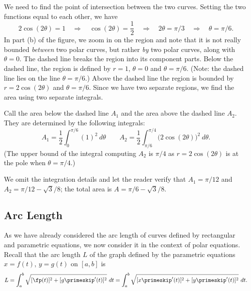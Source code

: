 {We need to find the point of intersection between the two curves. Setting the two functions equal to each other, we have
$$2\cos(2\theta) = 1 \quad \Rightarrow \quad \cos(2\theta) = \frac12 \quad \Rightarrow \quad 2\theta = \pi/3\quad \Rightarrow \quad \theta=\pi/6.$$
In part (b) of the figure, we zoom in on the region and note that it is not really bounded \textit{between} two polar curves, but rather \textit{by} two polar curves, along with $\theta=0$. The dashed line breaks the region into its component parts. Below the dashed line, the region is defined by $r=1$, $\theta=0$ and $\theta = \pi/6$. (Note: the dashed line lies on the line $\theta=\pi/6$.) Above the dashed line the region is bounded by $r=2\cos(2\theta)$ and $\theta =\pi/6$. Since we have two separate regions, we find the area using two separate integrals.

Call the area below the dashed line $A_1$ and the area above the dashed line $A_2$. They are determined by the following integrals:
$$A_1 = \frac12\int_0^{\pi/6} (1)^2\ d\theta\qquad  A_2 = \frac12\int_{\pi/6}^{\pi/4} \big(2\cos(2\theta)\big)^2\ d\theta.$$
(The upper bound of the integral computing $A_2$ is $\pi/4$ as $r=2\cos(2\theta)$ is at the pole when $\theta=\pi/4$.)

We omit the integration details and let the reader verify that $A_1 = \pi/12$ and $A_2 = \pi/12-\sqrt{3}/8$; the total area is $A = \pi/6-\sqrt{3}/8$.}

\subsection*{Arc Length}

As we have already considered the arc length of curves defined by rectangular and parametric equations, we now consider it in the context of polar equations. Recall that the arc length $L$ of the graph defined by the parametric equations $x=f(t)$, $y=g(t)$ on $[a,b]$ is
\begin{equation}L = \int_a^b \sqrt{[\fp(t)]^2 + [g\primeskip'(t)]^2}\ dt = \int_a^b \sqrt{[x\primeskip'(t)]^2+[y\primeskip'(t)]^2}\ dt.\label{eq:polar_arclength}\end{equation}

